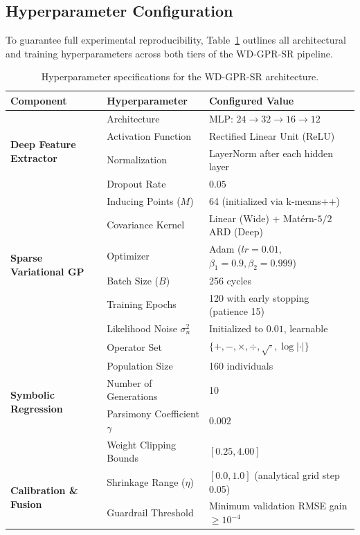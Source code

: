 \documentclass[a4paper,fleqn]{cas-sc}
\begin{document}
\subsection{Hyperparameter Configuration}
To guarantee full experimental reproducibility, Table~\ref{tab:hyperparameters} outlines all architectural and training hyperparameters across both tiers of the WD-GPR-SR pipeline.

\begin{table}[htbp]
\centering
\caption{Hyperparameter specifications for the WD-GPR-SR architecture.}
\label{tab:hyperparameters}
\footnotesize
\renewcommand{\arraystretch}{1.15}
\begin{tabular*}{\linewidth}{@{\extracolsep{\fill}}lll@{}}
\toprule
\textbf{Component} & \textbf{Hyperparameter} & \textbf{Configured Value} \\
\midrule
\multirow{4}{*}{\textbf{Deep Feature Extractor}} & Architecture & MLP: $24 \to 32 \to 16 \to 12$ \\
 & Activation Function & Rectified Linear Unit (ReLU) \\
 & Normalization & LayerNorm after each hidden layer \\
 & Dropout Rate & $0.05$ \\
\midrule
\multirow{6}{*}{\textbf{Sparse Variational GP}} & Inducing Points ($M$) & 64 (initialized via k-means++) \\
 & Covariance Kernel & Linear (Wide) + Matérn-$5/2$ ARD (Deep) \\
 & Optimizer & Adam ($lr = 0.01$, $\beta_1=0.9, \beta_2=0.999$) \\
 & Batch Size ($B$) & 256 cycles \\
 & Training Epochs & 120 with early stopping (patience 15) \\
 & Likelihood Noise $\sigma_n^2$ & Initialized to $0.01$, learnable \\
\midrule
\multirow{5}{*}{\textbf{Symbolic Regression}} & Operator Set & $\{+, -, \times, \div, \sqrt{\cdot}, \log|\cdot|\}$ \\
 & Population Size & 160 individuals \\
 & Number of Generations & 10 \\
 & Parsimony Coefficient $\gamma$ & $0.002$ \\
 & Weight Clipping Bounds & $[0.25, 4.00]$ \\
\midrule
\multirow{2}{*}{\textbf{Calibration \& Fusion}} & Shrinkage Range ($\eta$) & $[0.0, 1.0]$ (analytical grid step 0.05) \\
 & Guardrail Threshold & Minimum validation RMSE gain $\ge 10^{-4}$ \\
\bottomrule
\end{tabular*}
\end{table}
\end{document}
